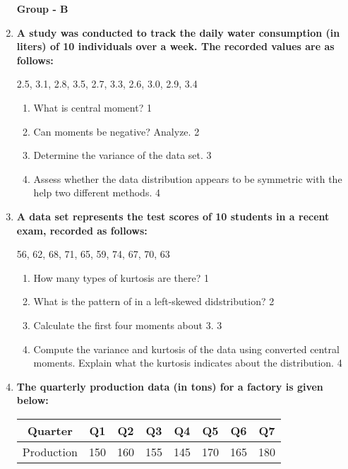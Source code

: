 \documentclass{article}
\begin{document}
\begin{enumerate}
  \begin{center}
\textbf{Group  - B}
\end{center}
  
  \item
\textbf{A study was conducted to track the daily water consumption (in liters) 
of 10 individuals over a week. The recorded values are as follows:}

\begin{center}
2.5, 3.1, 2.8, 3.5, 2.7, 3.3, 2.6, 3.0, 2.9, 3.4
\end{center}

\begin{enumerate}

  \item What is central moment? \hfill 1
 \item Can moments be negative? Analyze. \hfill 2
\item
Determine the variance of the data set. \hfill 3
\item
Assess whether the data distribution appears to be symmetric with the help
two different methods. \hfill 4
\end{enumerate}

  \item
\textbf{A data set represents the test scores of 10 students in a recent 
exam, recorded as follows:}

\begin{center}
56, 62, 68, 71, 65, 59, 74, 67, 70, 63
\end{center}

    \begin{enumerate}
    \item How many types of kurtosis are there? \hfill 1
    \item What is the pattern of in a left-skewed didstribution? \hfill 2
\item
Calculate the first four moments about 3. \hfill 3
\item
Compute the variance and kurtosis of the data using converted central moments. 
Explain what the kurtosis indicates about the distribution. \hfill 4
\end{enumerate}

\item
\textbf{The quarterly production data (in tons) for a factory is given below:}

\begin{table}[h]
\centering
\begin{tabular}{cccccccc}
Quarter    & Q1     & Q2     & Q3     & Q4     & Q5     & Q6     & Q7     \\ \hline
Production & 150    & 160    & 155    & 145    & 170    & 165    & 180    \\
\end{tabular}
\end{table}


\end{enumerate}
\end{document}
